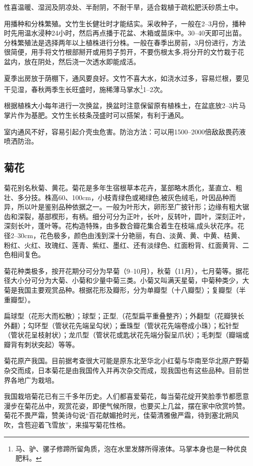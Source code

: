 \documentclass{ctexbook}
\begin{document}
性喜温暖、湿润及阴凉处、半耐阴，不耐干旱，适合栽植于疏松肥沃砂质土中。

用播种和分株繁殖。文竹生长健壮时才能结实。采收种子，一般在2--3月份，播种时先用温水浸种24小时，然后再点播于花盆、木箱或苗床中。30--40天即可出苗。分株繁殖法是选择两年以上植株进行分株。一般在春季出房前，3月份进行，方法很简便，用手将文竹根部掰开或用剪子剪开，不要伤根太多,将分开的文竹栽于花盆内，放在阴处，然后浇一次透水即能成活。

夏季出房放于荫棚下，通风要良好。文竹不喜大水，如浇水过多，容易烂根，要见干见湿，春秋两季生长旺盛时，施稀薄马掌水\footnote{马、驴、骡子修蹄所留角质，泡在水里发酵所得液体。马掌本身也是一种优良肥料。}1--2次。

根据植株大小每年进行一次换盆，换盆时注意保留原有植株土，在盆底放2--3片马掌片作为基肥。文竹生长枝条茂盛时可以搭架，有利于通风。

室内通风不好，容易引起介壳虫危害。防治方法：可以用1500--2000倍敌敌畏药液喷洒防治。
\subsection{菊花}
菊花别名秋菊、黄花。菊花是多年生宿根草本花卉，茎部略木质化，茎直立、粗壮、多分技。株高60、100cm，小枝青绿色或褐绿色,被灰色绒毛，叶因品种而异，所以叶是鉴别品种依据之一。一般为叶形大，卵形至广披针形；边缘有粗大锯齿和深裂，基部楔形，有柄。细分可分为正叶，长叶，反转叶，圆叶，深刻正叶，深刻长叶，蓬叶等。花构造特殊，由多数合瓣花集合着生在枝端,成头状花序。花径2--30cm，花色极多，颜色由浅到深十分艳丽，有白、淡黄、黄、中黄、桔黄、粉红、火红、玫瑰红、莲青、紫红、墨红、还有淡绿色、红面粉背、红面黄背、二色相间复色。

菊花种类极多，按开花期分可分为早菊（9--10月），秋菊（11月），七月菊等。据花径大小分可分为大菊、小菊和少量中菊三类。小菊又叫满天星菊，中菊种类少，大菊是我国主要观赏品种。根据花形及瓣形，分为单瓣型（十八瓣型）；复瓣型（半重瓣型）。

扁球型（花形大而松散）；球型；正型,（花型扁平重叠整齐）；外翻型（花瓣狭长外翻）；勾环型（管状花先端呈勾状）；垂珠型（管状花先端卷成小珠）；松针型（管状花呈枝射状）；龙爪型（管状花或匙状花先端分裂呈爪状）；毛刺型（瓣端或瓣背有刺状突起）等等。

菊花原产我国。目前据考查很大可能是原东北至华北小红菊与华南至华北原产野菊杂交而成，日本菊花是由我国传入并再次杂交而成，现我国也有这些品种。目前世界各地广为栽培。

我国栽培菊花已有三千多年历史。人们都喜爱菊花，每当菊花绽开笑脸季节都愿意漫步在菊花丛中，观赏花姿，即便气候所限，也要买上几盆，摆在家中欣赏吟赞。菊花不畏严霜，赞美诗句说“百花献媚抢时光，佳菊清雅傲严霜，待到塞北朔风吹，含苞迎着飞雪放”，来描写菊花性格。
\end{document}
